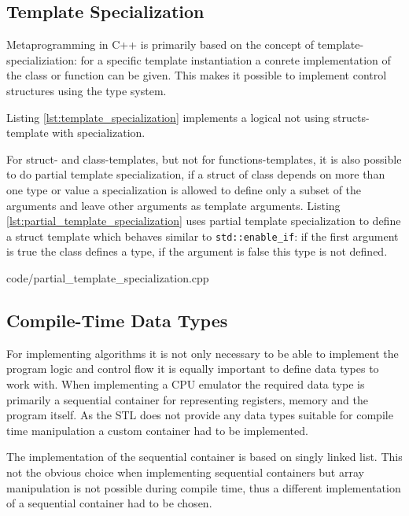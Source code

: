 \subsection{Template Specialization}
Metaprogramming in C++ is primarily based on the concept of template-specializiation: for a specific template instantiation
a conrete implementation of the class or function can be given. This makes it possible to implement control structures
using the type system. 

Listing \ref{lst:template_specialization} implements a logical not using structs-template with specialization.



For struct- and class-templates, but not for functions-templates, it is also possible to do partial template 
specialization, if a struct of class depends on more than one type or value a specialization is allowed to define
only a subset of the arguments and leave other arguments as template arguments. Listing
\ref{lst:partial_template_specialization} uses partial template specialization to define a struct template which
behaves similar to \lstinline{std::enable_if}: if the first argument is true the class defines a type, if the
argument is false this type is not defined.


    {code/partial_template_specialization.cpp}

\subsection{Compile-Time Data Types}
For implementing algorithms it is not only necessary to be able to implement the program logic and control flow
it is equally important to define data types to work with. When implementing a CPU emulator the required data type
is primarily a sequential container for representing registers, memory and the program itself. 
As the STL does not provide any data types suitable for compile time manipulation a custom container had to be implemented.

The implementation of the sequential container is based on singly linked list. 
This not the obvious choice when implementing sequential containers but array manipulation is not possible during 
compile time, thus a different implementation of a sequential container had to be chosen.

